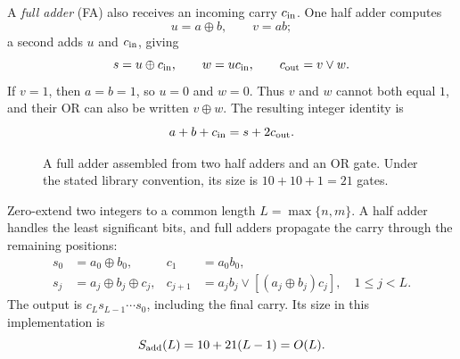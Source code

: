 \documentclass[11pt,oneside,openany]{book}
\theoremstyle{definition}
\begin{document}
A \emph{full adder} (FA) also receives an incoming carry $c_{\rm in}$. One half adder computes
\begin{equation}
 u=a\oplus b,\qquad v=ab;
\end{equation}
a second adds $u$ and $c_{\rm in}$, giving
\begin{equation}
 s=u\oplus c_{\rm in},\qquad w=uc_{\rm in},\qquad c_{\rm out}=v\lor w.
\end{equation}
If $v=1$, then $a=b=1$, so $u=0$ and $w=0$. Thus $v$ and $w$ cannot both equal $1$, and their OR can also be written $v\oplus w$. The resulting integer identity is
\begin{equation}
 a+b+c_{\rm in}=s+2c_{\rm out}.
\end{equation}
\par
\begin{figure}[htbp]
\centering
{}
\caption{A full adder assembled from two half adders and an OR gate. Under the stated library convention, its size is $10+10+1=21$ gates.}
\label{fig:fulladder}
\end{figure}
\par
Zero-extend two integers to a common length $L=\max\{n,m\}$. A half adder handles the least significant bits, and full adders propagate the carry through the remaining positions:
\begin{align}
 s_0&=a_0\oplus b_0,&c_1&=a_0b_0,\\
 s_j&=a_j\oplus b_j\oplus c_j,&
 c_{j+1}&=a_jb_j\lor[(a_j\oplus b_j)c_j],\quad1\le j<L.
\end{align}
The output is $c_Ls_{L-1}\cdots s_0$, including the final carry. Its size in this implementation is
\begin{equation}
 S_{\rm add}(L)=10+21(L-1)=O(L).
\end{equation}
\par
\end{document}
